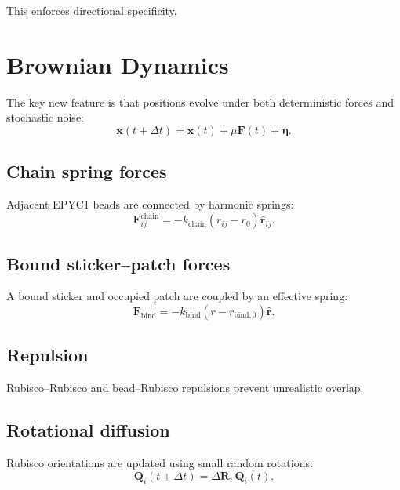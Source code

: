 \documentclass[11pt]{article}
\begin{document}
This enforces directional specificity.

\section{Brownian Dynamics}
The key new feature is that positions evolve under both deterministic forces and stochastic noise:
\[
\mathbf{x}(t+\Delta t)=\mathbf{x}(t)+\mu \mathbf{F}(t)+\boldsymbol{\eta}.
\]

\subsection{Chain spring forces}
Adjacent EPYC1 beads are connected by harmonic springs:
\[
\mathbf{F}_{ij}^{\text{chain}} = -k_{\text{chain}}(r_{ij}-r_0)\hat{\mathbf{r}}_{ij}.
\]

\subsection{Bound sticker--patch forces}
A bound sticker and occupied patch are coupled by an effective spring:
\[
\mathbf{F}_{\text{bind}} = -k_{\text{bind}}(r-r_{\text{bind},0})\hat{\mathbf{r}}.
\]

\subsection{Repulsion}
Rubisco--Rubisco and bead--Rubisco repulsions prevent unrealistic overlap.

\subsection{Rotational diffusion}
Rubisco orientations are updated using small random rotations:
\[
\mathbf{Q}_i(t+\Delta t)=\Delta\mathbf{R}_i\,\mathbf{Q}_i(t).
\]
\end{document}
